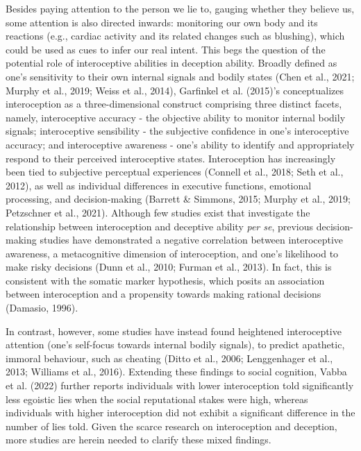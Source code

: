 \documentclass[
  man,mask,floatsintext]{apa6}
\begin{document}
Besides paying attention to the person we lie to, gauging whether they believe us, some attention is also directed inwards: monitoring our own body and its reactions (e.g., cardiac activity and its related changes such as blushing), which could be used as cues to infer our real intent. This begs the question of the potential role of interoceptive abilities in deception ability. Broadly defined as one's sensitivity to their own internal signals and bodily states (Chen et al., 2021; Murphy et al., 2019; Weiss et al., 2014), Garfinkel et al. (2015)'s conceptualizes interoception as a three-dimensional construct comprising three distinct facets, namely, interoceptive accuracy - the objective ability to monitor internal bodily signals; interoceptive sensibility - the subjective confidence in one's interoceptive accuracy; and interoceptive awareness - one's ability to identify and appropriately respond to their perceived interoceptive states. Interoception has increasingly been tied to subjective perceptual experiences (Connell et al., 2018; Seth et al., 2012), as well as individual differences in executive functions, emotional processing, and decision-making (Barrett \& Simmons, 2015; Murphy et al., 2019; Petzschner et al., 2021). Although few studies exist that investigate the relationship between interoception and deceptive ability \emph{per se}, previous decision-making studies have demonstrated a negative correlation between interoceptive awareness, a metacognitive dimension of interoception, and one's likelihood to make risky decisions (Dunn et al., 2010; Furman et al., 2013). In fact, this is consistent with the somatic marker hypothesis, which posits an association between interoception and a propensity towards making rational decisions (Damasio, 1996).

In contrast, however, some studies have instead found heightened interoceptive attention (one's self-focus towards internal bodily signals), to predict apathetic, immoral behaviour, such as cheating (Ditto et al., 2006; Lenggenhager et al., 2013; Williams et al., 2016). Extending these findings to social cognition, Vabba et al. (2022) further reports individuals with lower interoception told significantly less egoistic lies when the social reputational stakes were high, whereas individuals with higher interoception did not exhibit a significant difference in the number of lies told. Given the scarce research on interoception and deception, more studies are herein needed to clarify these mixed findings.
\end{document}
